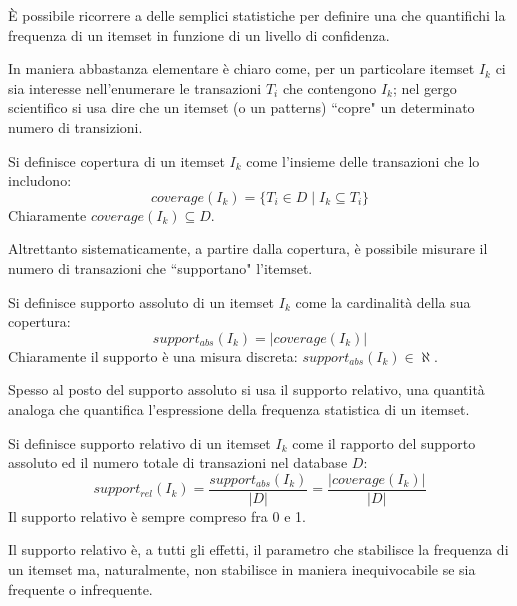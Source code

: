 {\`E} possibile ricorrere a delle semplici statistiche per definire una che quantifichi la frequenza di un itemset in funzione di un livello di confidenza. 

In maniera abbastanza elementare {\`e} chiaro come, per un particolare itemset $I_k$ ci sia interesse nell'enumerare le transazioni $T_i$ che contengono $I_k$; nel gergo scientifico si usa dire che un itemset (o un patterns) ``copre" un determinato numero di transizioni.

\begin{defn}
Si definisce copertura di un itemset $I_k$ come l'insieme delle transazioni che lo includono:
\begin{equation}
coverage(I_k) = \lbrace T_i \in D \mid I_k \subseteq T_i \rbrace
\end{equation}
Chiaramente $coverage(I_k) \subseteq D$.
\end{defn}

Altrettanto sistematicamente, a partire dalla copertura, {\`e} possibile misurare il numero di transazioni che ``supportano" l'itemset.

\begin{defn}
Si definisce supporto assoluto di un itemset \( I_k \) come la cardinalit{\`a} della sua copertura:
\begin{equation}
support_{abs}(I_k) = \lvert coverage(I_k) \rvert
\end{equation}
Chiaramente il supporto {\`e} una misura discreta: $support_{abs}(I_k) \in \aleph$.
\end{defn}

Spesso al posto del supporto assoluto si usa il supporto relativo, una quantit{\`a} analoga che quantifica l'espressione della frequenza statistica di un itemset.

\begin{defn}
Si definisce supporto relativo di un itemset \( I_k \) come il rapporto del supporto assoluto ed il numero totale di transazioni nel database \( D \):
\begin{equation}
support_{rel}(I_k) = \frac{support_{abs}(I_k)}{ \lvert D \rvert } = \frac{ \lvert coverage(I_k) \rvert }{ \lvert D \rvert }
\end{equation}
Il supporto relativo {\`e} sempre compreso fra 0 e 1.
\end{defn}

Il supporto relativo {\`e}, a tutti gli effetti, il parametro che stabilisce la frequenza di un itemset ma, naturalmente, non stabilisce in maniera inequivocabile se sia frequente o infrequente.

